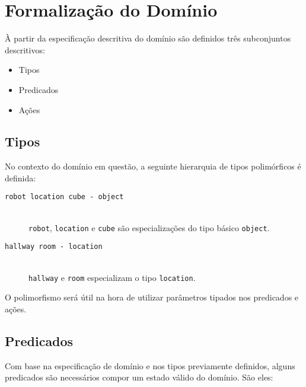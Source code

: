 \documentclass[letterpaper]{article}
\begin{document}
\section{Formalização do Domínio}

À partir da especificação descritiva do domínio são definidos três subconjuntos descritivos:

\begin{itemize}
\item Tipos
\item Predicados
\item Ações
\end{itemize}

\subsection{Tipos}

No contexto do domínio em questão, a seguinte hierarquia de tipos polimórficos é definida:

\begin{description}
\item[\texttt{robot location cube - object}] \hfill\\ \texttt{robot}, \texttt{location} e \texttt{cube} são especializações do tipo básico \texttt{object}.
\item[\texttt{hallway room - location}] \hfill\\ \texttt{hallway} e \texttt{room} especializam o tipo \texttt{location}.
\end{description}

O polimorfismo será útil na hora de utilizar parâmetros tipados nos predicados e ações.

\subsection{Predicados}

Com base na especificação de domínio e nos tipos previamente definidos, alguns predicados são necessários compor um 
estado válido do domínio. São eles:
\end{document}

